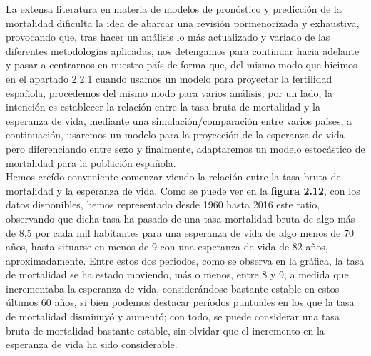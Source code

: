 La extensa literatura en materia de modelos de pronóstico y predicción de la mortalidad dificulta la idea de abarcar una revisión pormenorizada y exhaustiva, provocando que, tras hacer un análisis lo más actualizado y variado de las diferentes metodologías aplicadas, nos detengamos para continuar hacia adelante y pasar a centrarnos en nuestro país de forma que, del mismo modo que hicimos en el apartado 2.2.1 cuando usamos un modelo para proyectar la fertilidad española, procedemos del mismo modo para varios análisis; por un lado, la intención es establecer la relaci\'on entre la tasa bruta de mortalidad y la esperanza de vida, mediante una simulación/comparación entre varios países, a continuación, usaremos un modelo para la proyección de la esperanza de vida pero diferenciando entre sexo y finalmente, adaptaremos un modelo estocástico de mortalidad para la población española.\\

Hemos creído conveniente comenzar viendo la relación entre la tasa bruta de mortalidad y la esperanza de vida. Como se puede ver en la \textbf{figura 2.12}, con los datos disponibles, hemos representado desde 1960 hasta 2016 este ratio, observando que dicha tasa ha pasado de una tasa mortalidad bruta de algo más de 8,5 por cada mil habitantes para una esperanza de vida de algo menos de 70 años, hasta situarse en menos de 9 con una esperanza de vida de 82 años, aproximadamente. Entre estos dos periodos, como se observa en la gráfica, la tasa de mortalidad se ha estado moviendo, más o menos, entre 8 y 9, a medida que incrementaba la esperanza de vida, considerándose bastante estable en estos últimos 60 años, si bien podemos destacar períodos  puntuales en los que la tasa de mortalidad disminuyó y aumentó; con todo, se puede considerar una tasa bruta de mortalidad bastante estable, sin olvidar que el incremento en la esperanza de vida ha sido considerable.\\

